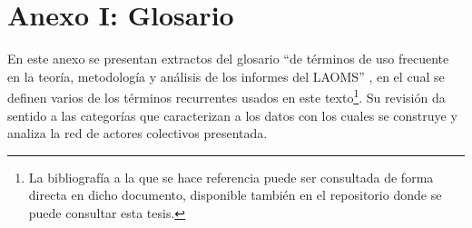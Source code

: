 \documentclass[letterpaper, 11pt]{book}
\theoremstyle{definition}
\theoremstyle{remark}
\begin{document}
\chapter*{Anexo I: Glosario}
\label{AnexoI}


En este anexo se presentan extractos del glosario ``de términos de uso frecuente en la teoría, metodología y análisis de los informes del LAOMS'' \citep[109--125]{2017_Cadena_ManualLAOMS}, en el cual se definen varios de los términos recurrentes usados en este texto\footnote{La bibliografía a la que se hace referencia puede ser consultada de forma directa en dicho documento, disponible también en el repositorio donde se puede consultar esta tesis.}.
Su revisión da sentido a las categorías que caracterizan a los datos con los cuales se construye y analiza la red de actores colectivos presentada.
\vspace{2em}
\end{document}
